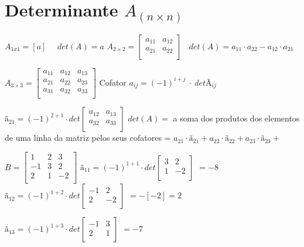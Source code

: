 \documentclass{article}
\begin{document}
\section{Determinante $A_{(n \times n)}$}

\bigbreak
$A_{1x1} = [a] \ \ \ \ \ \ det(A) = a$
\bigbreak
$A_{2 \times 2} = 
\begin{bmatrix}
    a_{11} & a_{12} \\
    a_{21} & a_{22} \\
\end{bmatrix} \ \ \ \ 
det(A) = a_{11} \cdot a_{22} - a_{12} \cdot a_{21}$

\bigbreak

$A_{3 \times 3} = 
\begin{bmatrix}
    a_{11} & a_{12} & a_{13} \\
    a_{21} & a_{22} & a_{23} \\  
    a_{31} & a_{32} & a_{33} \\  

\end{bmatrix}
$ \bigbreak
Cofator $a_{ij} = (-1)^{i + j} \ \cdot \ detÃ_{ij} $

$ã_{21} = (-1)^{2+1} \cdot det
 \begin{bmatrix}
    a_{12} & a_{13} \\
    a_{32} & a_{33} \\
 \end{bmatrix}$
\bigbreak
$det (A) = $ a soma dos produtos dos elementos de uma linha da matriz pelos 
seus cofatores = $a_{21} \cdot ã_{21} + a_{22} \cdot ã_{22} + a_{23} \cdot ã_{23} +$


$B =
\begin{bmatrix}
    1 & 2 & 3 \\
    -1 & 3 & 2 \\
    2 & 1 & -2 \\
\end{bmatrix}
$ \bigbreak
$ã_{11} = (-1)^{1+1} \cdot det
\begin{bmatrix}
    3 & 2 \\
    1 & -2 \\
\end{bmatrix}$
$=-8$ \bigbreak
$ã_{12} = (-1)^{1+2} \cdot det
\begin{bmatrix}
    -1 & 2 \\
    2 & -2 \\
\end{bmatrix}$
$=-[-2] = 2$ \bigbreak

$ã_{13} = (-1)^{1+3} \cdot det
\begin{bmatrix}
    -1 & 3 \\
    2 & 1 \\
\end{bmatrix}$
$=-7$
\bigbreak
\end{document}
